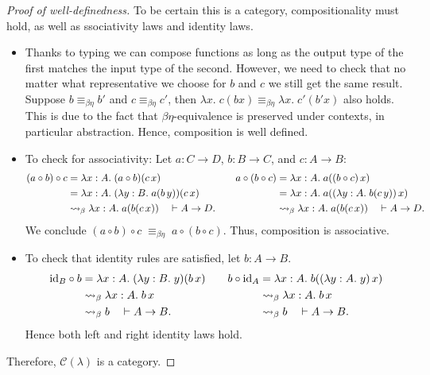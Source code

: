 \begin{proof}[Proof of well-definedness] To be certain this is a category, compositionality must hold, as well as ssociativity laws and identity laws.
  \begin{itemize}
  \item Thanks to typing we can compose functions as long as the output type of the first matches the input type of the second. However, we need to check that no matter what representative we choose for $b$ and $c$ we still get the same result. Suppose $b\equiv_{\beta\eta} b'$ and $c\equiv_{\beta\eta} c'$, then 
    \(
    \lambda x.\; c(bx) \equiv_{\beta\eta} \lambda x.\; c'(b'x)
    \) also holds. This is due to the fact that $\beta\eta$-equivalence is preserved under contexts, in particular abstraction. Hence, composition is well defined.
    
  \item To check for associativity: Let $a : C \to D$, $b : B \to C$, and $c : A \to B$:
    \[
      \begin{aligned}
        (a \circ b) \circ c
        &= \lambda x:A.\; (a \circ b)(c\,x) \\
        &= \lambda x:A.\; (\lambda y:B.\; a(b\,y))(c\,x) \\
        &\mathrel{\leadsto}_\beta \lambda x:A.\; a(b(c\,x)) \quad \vdash A \to D.
      \end{aligned}
      \qquad
      \begin{aligned}
        a \circ (b \circ c)
        &= \lambda x:A.\; a((b \circ c)\,x) \\
        &= \lambda x:A.\; a((\lambda y:A.\; b(c\,y))\,x) \\
        &\mathrel{\leadsto}_\beta \lambda x:A.\; a(b(c\,x)) \quad \vdash A \to D.
      \end{aligned}
    \]
    We conclude
    \(
    (a \circ b) \circ c \;\equiv_{\beta\eta}\; a \circ (b \circ c).
    \)
    Thus, composition is associative.
  \item To check that identity rules are satisfied, let $b : A \to B$.  
    \[
      \begin{aligned}
        \mathrm{id}_B \circ b 
        &= \lambda x:A.\; (\lambda y:B.\; y)(b\,x) \\
        &\mathrel{\leadsto}_\beta \lambda x:A.\; b\,x \\
        &\mathrel{\leadsto}_\beta b \quad \vdash A \to B.
      \end{aligned}
      \qquad
      \begin{aligned}
        b \circ \mathrm{id}_A
        &= \lambda x:A.\; b((\lambda y:A.\; y)\,x) \\
        &\mathrel{\leadsto}_\beta \lambda x:A.\; b\,x \\
        &\mathrel{\leadsto}_\beta b \quad \vdash A \to B.
      \end{aligned}
    \]
    Hence both left and right identity laws hold.
  \end{itemize}
  Therefore, $\mathcal{C}(\lambda)$ is a category.
\end{proof}

